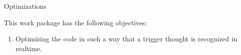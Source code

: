
\begin{workpackage}{Optimizations}
  \label{wp:opt} %



  \makewptable %
    
  \begin{wpobjectives}
    This work package has the following objectives:
    \begin{enumerate}
 \item Optimizing the code in such a way that a trigger thought is recognized 
in realtime.
    \end{enumerate}
  \end{wpobjectives}
  
  \begin{wpdescription}
 

    
  \end{wpdescription}
  
  \begin{wpdeliverables}

    \label{dev:wp5merge}

    \label{dev:MR0.4}
    
  \end{wpdeliverables}
\end{workpackage}
